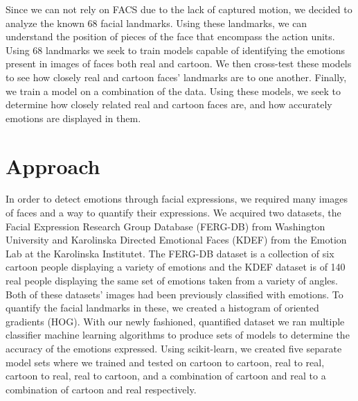 \documentclass{Project}
\begin{document}
Since we can not rely on FACS due to the lack of captured motion, we decided to
analyze the known 68 facial landmarks. Using these landmarks, we can understand
the position of pieces of the face that encompass the action units. Using 68 
landmarks we seek to train models capable of identifying the emotions present
in images of faces both real and cartoon. We then cross-test these models to see
how closely real and cartoon faces' landmarks are to one another. Finally, we
train a model on a combination of the data. Using these models, we seek to determine 
how closely related real and cartoon faces are, and how accurately emotions are 
displayed in them.

\section{Approach}
In order to detect emotions through facial expressions, we required many 
images of faces and a way to quantify their expressions. We acquired two datasets, the 
Facial Expression Research Group Database (FERG-DB) from Washington University
and Karolinska Directed Emotional Faces (KDEF) from the Emotion Lab at the Karolinska Institutet.
\cite{aneja2016modeling}\cite{KDEF}  
The FERG-DB dataset is a collection of six cartoon people displaying
a variety of emotions and the KDEF dataset is of 140 real people displaying the 
same set of emotions taken from a variety of angles. Both of these datasets' images
had been previously classified with emotions. To quantify the facial landmarks
in these, we created a histogram of oriented gradients (HOG).\cite{geitgey_2016}
With our newly fashioned, quantified dataset we ran multiple classifier machine
learning algorithms to produce sets of models to determine the accuracy of the
emotions expressed. Using scikit-learn, we created five separate model sets
where we trained and tested on cartoon to cartoon, real to real, cartoon to
real, real to cartoon, and a combination of cartoon and real to a 
combination of cartoon and real respectively. \cite{scikit-learn}
\end{document}
